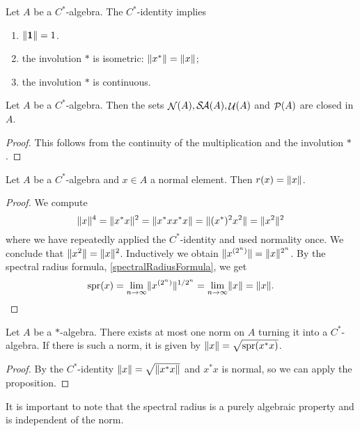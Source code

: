 \begin{lemma} \label{consequencesC*}
Let $A$ be a $C^*$-algebra. The $C^*$-identity implies
\begin{enumerate}
\item  $\lVert\boldsymbol{\mathrm{1}}\rVert = 1$.
\item the involution $*$ is isometric: $\lVert x^*\rVert = \lVert x\rVert$;
\item the involution $*$ is continuous.
\end{enumerate}
\end{lemma}

\begin{lemma}
Let $A$ be a $C^*$-algebra. Then the sets $\mathop{\mathcal{N}}\nolimits(A), \mathop{\mathcal{S}\hspace{-0.15em}\mathcal{A}}\nolimits(A), \mathop{\mathcal{U}}\nolimits(A)$ and $\mathop{\mathcal{P}}\nolimits(A)$ are closed in $A$. 
\end{lemma}
\begin{proof}
This follows from the continuity of the multiplication and the involution $*$.
\end{proof}

\begin{proposition} \label{normNormalElement}
Let $A$ be a $C^*$-algebra and $x\in A$ a normal element. Then $r(x) = \lVert x\rVert$.
\end{proposition}
\begin{proof}
We compute
\[ \lVert x\rVert^4 = \lVert x^*x\rVert^2 = \lVert x^*xx^*x\rVert = \lVert(x^*)^2x^2\rVert = \lVert x^2\rVert^2 \]
where we have repeatedly applied the $C^*$-identity and used normality once. We conclude that $\lVert x^2\rVert = \lVert x\rVert^2$. Inductively we obtain $\lVert x^{(2^n)}\rVert = \lVert x\rVert^{2^n}$. By the spectral radius formula, \ref{spectralRadiusFormula}, we get
\[ \operatorname{spr}(x) = \lim_{n\to\infty}\lVert x^{(2^n)}\rVert^{1/2^n} = \lim_{n\to\infty}\lVert x\rVert = \lVert x\rVert. \]
\end{proof}
\begin{corollary} \label{atMostOneNorm}
Let $A$ be a $*$-algebra. There exists at most one norm on $A$ turning it into a $C^*$-algebra. If there is such a norm, it is given by $\lVert x\rVert = \sqrt{\operatorname{spr}(x^*x)}$.
\end{corollary}
\begin{proof}
By the $C^*$-identity $\lVert x\rVert = \sqrt{\lVert x^*x\rVert}$ and $x^*x$ is normal, so we can apply the proposition.
\end{proof}
It is important to note that the spectral radius is a purely algebraic property and is independent of the norm.

